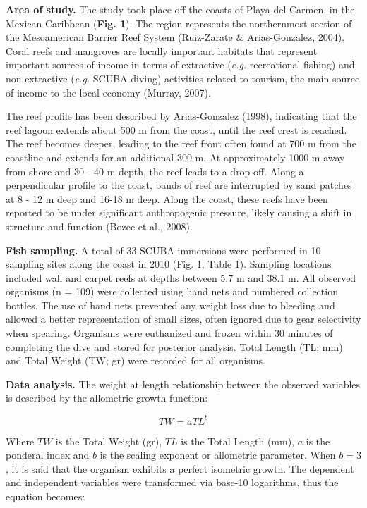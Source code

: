 \documentclass[12pt,]{article}
\begin{document}
\textbf{Area of study.} The study took place off the coasts of Playa del
Carmen, in the Mexican Caribbean (\textbf{Fig. 1}). The region
represents the northernmost section of the Mesoamerican Barrier Reef
System (Ruiz-Zarate \& Arias-Gonzalez, 2004). Coral reefs and mangroves
are locally important habitats that represent important sources of
income in terms of extractive (\emph{e.g.} recreational fishing) and
non-extractive (\emph{e.g.} SCUBA diving) activities related to tourism,
the main source of income to the local economy (Murray, 2007).

The reef profile has been described by Arias-Gonzalez (1998), indicating
that the reef lagoon extends about 500 m from the coast, until the reef
crest is reached. The reef becomes deeper, leading to the reef front
often found at 700 m from the coastline and extends for an additional
300 m. At approximately 1000 m away from shore and 30 - 40 m depth, the
reef leads to a drop-off. Along a perpendicular profile to the coast,
bands of reef are interrupted by sand patches at 8 - 12 m deep and 16-18
m deep. Along the coast, these reefs have been reported to be under
significant anthropogenic pressure, likely causing a shift in structure
and function (Bozec et al., 2008).

\textbf{Fish sampling.} A total of 33 SCUBA immersions were performed in
10 sampling sites along the coast in 2010 (Fig. 1, Table 1). Sampling
locations included wall and carpet reefs at depths between 5.7 m and
38.1 m. All observed organisms (n = 109) were collected using hand nets
and numbered collection bottles. The use of hand nets prevented any
weight loss due to bleeding and allowed a better representation of small
sizes, often ignored due to gear selectivity when spearing. Organisms
were euthanized and frozen within 30 minutes of completing the dive and
stored for posterior analysis. Total Length (TL; mm) and Total Weight
(TW; gr) were recorded for all organisms.

\textbf{Data analysis.} The weight at length relationship between the
observed variables is described by the allometric growth function:

\[TW = aTL^b\]

Where \(TW\) is the Total Weight (gr), \(TL\) is the Total Length (mm),
\(a\) is the ponderal index and \(b\) is the scaling exponent or
allometric parameter. When \(b = 3\), it is said that the organism
exhibits a perfect isometric growth. The dependent and independent
variables were transformed via base-10 logarithms, thus the equation
becomes:
\end{document}
